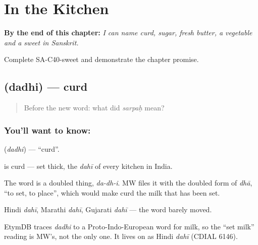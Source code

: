 
\chapter{In the Kitchen}
\label{ch:sa-in-the-kitchen}

\begin{chapteropening}
\textbf{By the end of this chapter:} \emph{I can name curd, sugar, fresh butter, a vegetable and a sweet in Sanskrit.}

Complete SA-C40-sweet and demonstrate the chapter promise.
\end{chapteropening}

\section[\texorpdfstring{\sk{दधि} (dadhi)}{दधि (dadhi)}]{ (dadhi) — curd}

\label{lesson:SA-C40-curd}



\begin{quote}
Before the new word: what did \emph{sarpaḥ} mean?
\end{quote}

\subsection*{You'll want to know: }
\textbf{} (\emph{dadhi}) — \textquotedblleft{}curd\textquotedblright{}.

\textbf{} is curd —  set thick, the \emph{dahī} of every kitchen in India.

The word is a doubled thing, \emph{da-dh-i}. MW files it with the doubled form of \emph{dhā}, \textquotedblleft{}to set, to place\textquotedblright{}, which would make curd the milk that has been set.

Hindi \emph{dahī}, Marathi \emph{dahī}, Gujarati \emph{dahī} — the word barely moved.

\begin{cousinweb}
EtymDB traces \emph{dadhi} to a Proto-Indo-European word for milk, so the \textquotedblleft{}set milk\textquotedblright{} reading is MW's, not the only one. It lives on as Hindi \emph{dahī} (CDIAL 6146).
\end{cousinweb}

